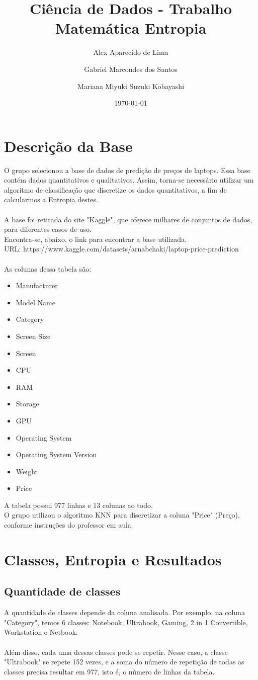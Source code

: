 \documentclass{report}
\title{Ciência de Dados - Trabalho Matemática Entropia}
\author{Alex Aparecido de Lima \and Gabriel Marcondes dos Santos \and Mariana Miyuki Suzuki Kobayashi}
\date{\today{}}
\begin{document}
\maketitle

\section{Descrição da Base}
O grupo selecionou a base de dados de predição de preços de laptops. Essa base contém dados quantitativos e qualitativos. Assim, torna-se necessário utilizar um algoritmo de classificação que discretize os dados quantitativos, a fim de calcularmos a Entropia destes.\\\\
A base foi retirada do site "Kaggle", que oferece milhares de conjuntos de dados, para diferentes casos de uso.\\
Encontra-se, abaixo, o link para encontrar a base utilizada.\\
URL: https://www.kaggle.com/datasets/arnabchaki/laptop-price-prediction\\\\
As colunas dessa tabela são:
\begin{itemize}
    \item Manufacturer
    \item Model Name 
    \item Category
    \item Screen Size
    \item Screen
    \item CPU
    \item RAM
    \item Storage
    \item GPU
    \item Operating System
    \item Operating System Version
    \item Weight
    \item Price
\end{itemize}
A tabela possui 977 linhas e 13 colunas ao todo. \\
O grupo utilizou o algoritmo KNN para discretizar a coluna "Price" (Preço), conforme instruções do professor em aula.
\newpage

\section{Classes, Entropia e Resultados}
\subsection{Quantidade de classes}
A quantidade de classes depende da coluna analisada. Por exemplo, na coluna "Category", temos 6 classes: Notebook, Ultrabook, Gaming, 2 in 1 Convertible, Workstation e Netbook.\\\\
Além disso, cada uma dessas classes pode se repetir. Nesse caso, a classe "Ultrabook" se repete 152 vezes, e a soma do número de repetição de todas as classes precisa resultar em 977, isto é, o número de linhas da tabela.
\end{document}
